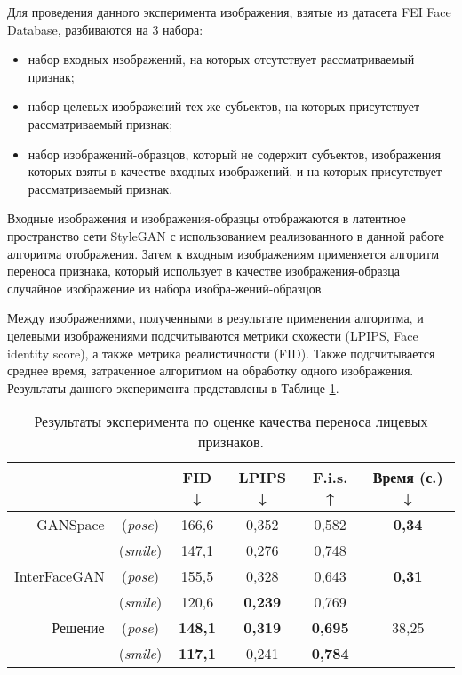 Для проведения данного эксперимента изображения, взятые из датасета FEI Face Database, разбиваются на 3 набора:
\begin{itemize}

\item набор входных изображений, на которых отсутствует рассматриваемый признак;
\item набор целевых изображений тех же субъектов, на которых присутствует рассматриваемый признак; 
\item набор изображений-образцов, который не содержит субъектов, изображения которых взяты в качестве входных изображений, и на которых присутствует рассматриваемый признак.
\end{itemize}
Входные изображения и изображения-образцы отображаются в латентное пространство сети StyleGAN с использованием реализованного в данной работе алгоритма отображения.
Затем к входным изображениям применяется алгоритм переноса признака, который использует в качестве изображения-образца случайное изображение из набора изобра-жений-образцов.

Между изображениями, полученными в результате применения алгоритма, и целевыми изображениями подсчитываются метрики схожести (LPIPS, Face identity score), а также метрика реалистичности (FID).
Также подсчитывается среднее время, затраченное алгоритмом на обработку одного изображения.
Результаты данного эксперимента представлены в Таблице \ref{tab:exp2}.

\begin{table}
\begin{center}
  \caption{Результаты эксперимента по оценке качества переноса лицевых признаков.}
  \label{tab:exp2}
  \begin{tabular}{ |r c|c|c|c|c| } 
    \hline
      & & FID ↓ & LPIPS ↓ & F.i.s. ↑ & Время (с.) ↓ \\ 
    \hline\hline
    GANSpace & (\emph{pose}) & 166,6 & 0,352 & 0,582 & \textbf{0,34} \\
            & (\emph{smile}) & 147,1 & 0,276 & 0,748 &  \\
    \hline
    InterFaceGAN 
             & (\emph{pose}) & 155,5 & 0,328 & 0,643 & \textbf{0,31} \\
            & (\emph{smile}) & 120,6 & \textbf{0,239} & 0,769 & \\
    \hline
    Решение  & (\emph{pose}) & \textbf{148,1} & \textbf{0,319} & \textbf{0,695} & 38,25 \\ 
            & (\emph{smile}) & \textbf{117,1} & 0,241 & \textbf{0,784} &  \\ 
    \hline
  \end{tabular}
\end{center}
\end{table}

